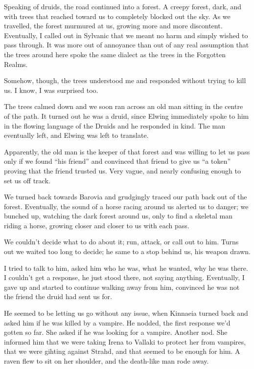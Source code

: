 Speaking of druids, the road continued into a forest. A creepy forest, dark, and with trees that reached toward us to completely blocked out the sky. As we travelled, the forest murmured at us, growing more and more discontent. Eventually, I called out in Sylvanic that we meant no harm and simply wished to pass through. It was more out of annoyance than out of any real assumption that the trees around here spoke the same dialect as the trees in the Forgotten Realms.

Somehow, though, the trees understood me and responded without trying to kill us. I know, I was surprised too.

The trees calmed down and we soon ran across an old man sitting in the centre of the path. It turned out he was a druid, since Elwing immediately spoke to him in the flowing language of the Druids and he responded in kind. The man eventually left, and Elwing was left to translate.

Apparently, the old man is the keeper of that forest and was willing to let us pass only if we found ``his friend'' and convinced that friend to give us ``a token'' proving that the friend trusted us. Very vague, and nearly confusing enough to set us off track.

We turned back towards Barovia and grudgingly traced our path back out of the forest. Eventually, the sound of a horse racing around us alerted us to danger; we bunched up, watching the dark forest around us, only to find a skeletal man riding a horse, growing closer and closer to us with each pass.

We couldn't decide what to do about it; run, attack, or call out to him. Turns out we waited too long to decide; he same to a stop behind us, his weapon drawn.

I tried to talk to him, asked him who he was, what he wanted, why he was there. I couldn't get a response, he just stood there, not saying anything. Eventually, I gave up and started to continue walking away from him, convinced he was not the friend the druid had sent us for.

He seemed to be letting us go without any issue, when Kinnaeia turned back and asked him if he was killed by a vampire. He nodded, the first response we'd gotten so far. She asked if he was looking for a vampire. Another nod. She informed him that we were taking Irena to Vallaki to protect her from vampires, that we were gihting against Strahd, and that seemed to be enough for him. A raven flew to sit on her shoulder, and the death-like man rode away.

